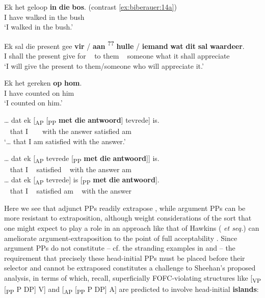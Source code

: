 \documentclass[output=paper]{LSP/langsci}
\begin{document}
\ea%
    \label{ex:biberauer:20}
    \ea  \label{ex:biberauer:20a}
    \gll    Ek het    geloop \textbf{in} \textbf{die} \textbf{bos}.        (contrast \ref{ex:biberauer:14a})   \\
	  I    have walked in the bush \\
    \glt ‘I walked in the bush.’ 

 \ex    \label{ex:biberauer:20b}
\gll Ek sal    die present gee  \textbf{vir} / \textbf{aan} \textbf{\textsuperscript{??}} \textbf{hulle} / \textbf{iemand} \textbf{wat} \textbf{dit}  \textbf{sal} \textbf{waardeer}.\\
     I   shall the present give for ~  to     {} them ~ someone what it    shall appreciate\\
\glt ‘I will give the present to them/someone who will appreciate it.’

 \ex    \label{ex:biberauer:20c}
\gll Ek het  gereken  \textbf{op} \textbf{hom}.\\
  I   have counted on him\\
\glt ‘I counted on him.’
\z
\z

\ea\label{ex:biberauer:21} 
\ea\label{ex:biberauer:21a} 
\gll … dat  ek [\textsubscript{AP} [\textsubscript{PP} \textbf{met} \textbf{die} \textbf{antwoord}] tevrede] is.\\
     ~ that I      ~                ~                     with the answer        satisfied am\\
  \glt ‘… that I am satisfied with the answer.’

 \ex\label{ex:biberauer:21b} 
\gll  … dat  ek [\textsubscript{AP} tevrede [\textsubscript{PP} \textbf{met}  \textbf{die} \textbf{antwoord}]]  is.\\
      ~   that I     ~     satisfied  ~   with the answer          am\\

 \ex\label{ex:biberauer:21c} 
\gll  … dat  ek [\textsubscript{AP} tevrede]  is [\textsubscript{PP} \textbf{met} \textbf{die} \textbf{antwoord}].\\
      ~   that I   ~      satisfied  am  ~  with the answer\\
\z
\z

Here we see that adjunct PPs readily extrapose , while argument PPs can be more resistant to extraposition, although weight considerations of the sort that one might expect to play a role in an approach like that of Hawkins (\citeyear{Hawkins1994} \textit{et seq.}) can ameliorate argument-extraposition to the point of full acceptability . Since argument PPs do not constitute  – cf. the stranding examples in  and  – the requirement that precisely these head-initial PPs must be placed before their selector and cannot be extraposed constitutes a challenge to Sheehan’s proposed analysis, in terms of which, recall, superficially FOFC-violating structures like [\textsubscript{VP} [\textsubscript{PP} P DP] V] and [\textsubscript{AP} [\textsubscript{PP} P DP] A] are predicted to involve head-initial \textbf{islands}:
\end{document}
